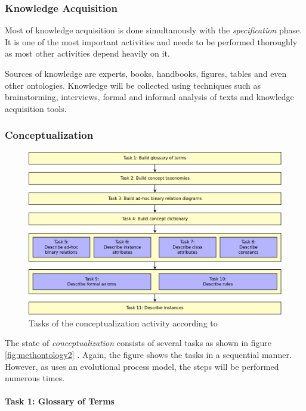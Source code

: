 \subsubsection{Knowledge Acquisition}

Most of knowledge acquisition is done simultanously with the \emph{specification} phase. It is one of the most important activities and needs to be performed thoroughly as most other activities depend heavily on it.

Sources of knowledge are experts, books, handbooks, figures, tables and even other ontologies. Knowledge will be collected using techniques such as brainstorming, interviews, formal and informal analysis of texts and knowledge acquisition tools.

\subsubsection{Conceptualization}

\begin{figure}
  \includegraphics[width=\textwidth]{figures/methontology_tasks.png}
  \caption{Tasks of the conceptualization activity according to \methontology \cite{MethontologyLegal}}
  \label{fig:methontology1}
\end{figure}

The state of \emph{conceptualization} consists of several tasks as shown in figure \ref{fig:methontology2} \cite{MethontologyLegal}. Again, the figure shows the tasks in a sequential manner. However, as \methontology uses an evolutional process model, the steps will be performed numerous times.

\paragraph{Task 1: Glossary of Terms}

